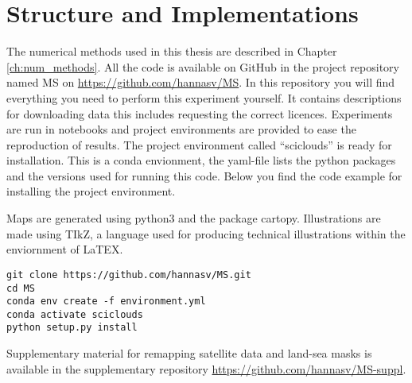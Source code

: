 \section{Structure and Implementations}
The numerical methods used in this thesis are described in Chapter \ref{ch:num_methods}. All the code is available on GitHub in the project repository named MS on \href{https://github.com/hannasv/MS}{https://github.com/hannasv/MS}. In this repository you will find everything you need to perform this experiment yourself. It contains descriptions for downloading data this includes requesting the correct licences. Experiments are run in notebooks and project environments are provided to ease the reproduction of results. The project environment called ``sciclouds'' is ready for installation. This is a conda envionment, the yaml-file lists the python packages and the versions used for running this code. Below you find the code example for installing the project environment.

Maps are generated using python3 and the package cartopy. Illustrations are made using TIkZ, a language used for producing technical illustrations within the enviornment of LaTEX.

\begin{verbatim}
git clone https://github.com/hannasv/MS.git
cd MS
conda env create -f environment.yml
conda activate sciclouds
python setup.py install
\end{verbatim}
Supplementary material for remapping satellite data and land-sea masks is available in the supplementary repository \href{https://github.com/hannasv/MS-suppl}{https://github.com/hannasv/MS-suppl}.